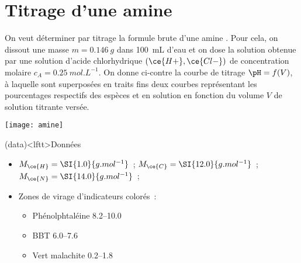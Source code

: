 \documentclass[a4paper, 10pt, final, garamond]{book}
\begin{document}
\section{Titrage d'une amine}
\noindent
\begin{minipage}[c]{.55\linewidth}
	On veut déterminer par titrage la formule brute d'une amine
	. Pour cela, on dissout une masse $m = \SI{0.146}{g}$ dans
	\SI{100}{mL} d'eau et on dose la solution obtenue par une solution d'acide
	chlorhydrique $(\ce{H+},\ce{Cl-})$ de concentration molaire $c_A =
		\SI{0.25}{mol.L^{-1}}$. On donne ci-contre la courbe de titrage $\pH = f(V)$,
	à laquelle sont superposées en traits fins deux courbes représentant les
	pourcentages respectifs des espèces  et
	 en solution en fonction du volume $V$ de solution
	titrante versée.
	\smallbreak
\end{minipage}
\hfill
\begin{minipage}[c]{.45\linewidth}
	\vspace{0pt}
	\begin{center}
		\texttt{[image: amine]}
	\end{center}
\end{minipage}
\begin{tcb}(data)<lftt>{Données}
	\begin{itemize}
		\item $M_{\ce{H}} = \SI{1.0}{g.mol^{-1}}$~; $M_{\ce{C}} =
			      \SI{12.0}{g.mol^{-1}}$~; $M_{\ce{N}} = \SI{14.0}{g.mol^{-1}}$~;
		\item Zones de virage d'indicateurs colorés~:
		      \begin{itemize}
			      \item Phénolphtaléine \numrange{8.2}{10.0}
			      \item BBT \numrange{6.0}{7.6}
			      \item Vert malachite \numrange{0.2}{1.8}
		      \end{itemize}
	\end{itemize}
\end{tcb}

\end{document}
